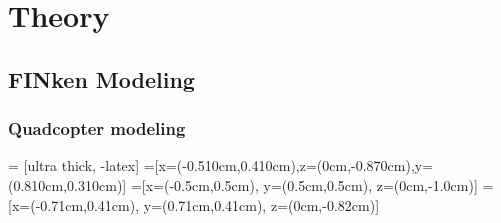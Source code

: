 \chapter{Theory}
    \label{chap:theory}
    
    \section{FINken Modeling}
    \label{sec:theoryModel}
    
    \subsection{Quadcopter modeling}
    \label{sec:copterModel}
     = [ultra thick, -latex]
    =[x={(-0.510cm,0.410cm)},z={(0cm,-0.870cm)},y={(0.810cm,0.310cm)}]
    =[x={(-0.5cm,0.5cm)}, y={(0.5cm,0.5cm)}, z={(0cm,-1.0cm)}]
    =[x={(-0.71cm,0.41cm)}, y={(0.71cm,0.41cm)}, z={(0cm,-0.82cm)}]
    
